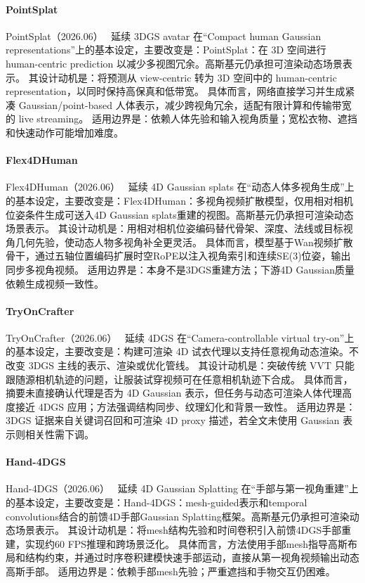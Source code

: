 \paragraph{PointSplat}
PointSplat（2026.06）~\cite{2606_32036} 延续 3DGS avatar 在“Compact human Gaussian representations”上的基本设定，主要改变是：PointSplat：在 3D 空间进行 human-centric prediction 以减少多视图冗余。高斯基元仍承担可渲染动态场景表示。
其设计动机是：将预测从 view-centric 转为 3D 空间中的 human-centric representation，以同时保持高保真和低带宽。
具体而言，网络直接学习并生成紧凑 Gaussian/point-based 人体表示，减少跨视角冗余，适配有限计算和传输带宽的 live streaming。
适用边界是：依赖人体先验和输入视角质量；宽松衣物、遮挡和快速动作可能增加难度。

\paragraph{Flex4DHuman}
Flex4DHuman（2026.06）~\cite{2606_13655} 延续 4D Gaussian splats 在“动态人体多视角生成”上的基本设定，主要改变是：Flex4DHuman：多视角视频扩散模型，仅用相对相机位姿条件生成可送入4D Gaussian splats重建的视图。高斯基元仍承担可渲染动态场景表示。
其设计动机是：用相对相机位姿编码替代骨架、深度、法线或目标视角几何先验，使动态人物多视角补全更灵活。
具体而言，模型基于Wan视频扩散骨干，通过五轴位置编码扩展时空RoPE以注入视角索引和连续SE(3)位姿，输出同步多视角视频。
适用边界是：本身不是3DGS重建方法；下游4D Gaussian质量依赖生成视频一致性。

\paragraph{TryOnCrafter}
TryOnCrafter（2026.06）~\cite{2606_26092} 延续 4DGS 在“Camera-controllable virtual try-on”上的基本设定，主要改变是：构建可渲染 4D 试衣代理以支持任意视角动态渲染。不改变 3DGS 主线的表示、渲染或优化管线。
其设计动机是：突破传统 VVT 只能跟随源相机轨迹的问题，让服装试穿视频可在任意相机轨迹下合成。
具体而言，摘要未直接确认代理是否为 4D Gaussian 表示，但任务与动态可渲染人体代理高度接近 4DGS 应用；方法强调结构同步、纹理幻化和背景一致性。
适用边界是：3DGS 证据来自关键词召回和可渲染 4D proxy 描述，若全文未使用 Gaussian 表示则相关性需下调。

\paragraph{Hand-4DGS}
Hand-4DGS（2026.06）~\cite{2606_19156} 延续 4D Gaussian Splatting 在“手部与第一视角重建”上的基本设定，主要改变是：Hand-4DGS：mesh-guided表示和temporal convolutions结合的前馈4D手部Gaussian Splatting框架。高斯基元仍承担可渲染动态场景表示。
其设计动机是：将mesh结构先验和时间卷积引入前馈4DGS手部重建，实现约60 FPS推理和跨场景泛化。
具体而言，方法使用手部mesh指导高斯布局和结构约束，并通过时序卷积建模快速手部运动，直接从第一视角视频输出动态高斯手部。
适用边界是：依赖手部mesh先验；严重遮挡和手物交互仍困难。
